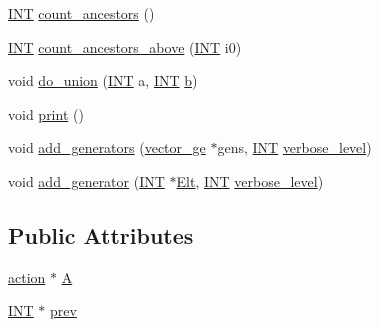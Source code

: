 \begin{DoxyCompactItemize}
\item 
\mbox{\hyperlink{galois_8h_a09fddde158a3a20bd2dcadb609de11dc}{I\+NT}} \mbox{\hyperlink{classunion__find_ad98f42a8846fb89237b9c27e594ec2ee}{count\+\_\+ancestors}} ()
\item 
\mbox{\hyperlink{galois_8h_a09fddde158a3a20bd2dcadb609de11dc}{I\+NT}} \mbox{\hyperlink{classunion__find_a5f30bf72e328168c13e4e68f7c2d4483}{count\+\_\+ancestors\+\_\+above}} (\mbox{\hyperlink{galois_8h_a09fddde158a3a20bd2dcadb609de11dc}{I\+NT}} i0)
\item 
void \mbox{\hyperlink{classunion__find_a7c57b5cf10387d978dc5c46c0e5f5f91}{do\+\_\+union}} (\mbox{\hyperlink{galois_8h_a09fddde158a3a20bd2dcadb609de11dc}{I\+NT}} a, \mbox{\hyperlink{galois_8h_a09fddde158a3a20bd2dcadb609de11dc}{I\+NT}} \mbox{\hyperlink{alphabet2_8_c_a148e3876077787926724625411d6e7a9}{b}})
\item 
void \mbox{\hyperlink{classunion__find_af6000e243b74029060540235bd2b89fe}{print}} ()
\item 
void \mbox{\hyperlink{classunion__find_af020c4dd8966a2917b6ae1f6c925c4dc}{add\+\_\+generators}} (\mbox{\hyperlink{classvector__ge}{vector\+\_\+ge}} $\ast$gens, \mbox{\hyperlink{galois_8h_a09fddde158a3a20bd2dcadb609de11dc}{I\+NT}} \mbox{\hyperlink{simeon_8_c_a818073fbcc2f439e7c56952f67386122}{verbose\+\_\+level}})
\item 
void \mbox{\hyperlink{classunion__find_a40d8a9f64ec55632cefd15df02bf7204}{add\+\_\+generator}} (\mbox{\hyperlink{galois_8h_a09fddde158a3a20bd2dcadb609de11dc}{I\+NT}} $\ast$\mbox{\hyperlink{simeon_8_c_aec1406935bdb1fee3561fcb840964100}{Elt}}, \mbox{\hyperlink{galois_8h_a09fddde158a3a20bd2dcadb609de11dc}{I\+NT}} \mbox{\hyperlink{simeon_8_c_a818073fbcc2f439e7c56952f67386122}{verbose\+\_\+level}})
\end{DoxyCompactItemize}
\subsection*{Public Attributes}
\begin{DoxyCompactItemize}
\item 
\mbox{\hyperlink{classaction}{action}} $\ast$ \mbox{\hyperlink{classunion__find_ae5239695ba43f51fd2984ed7cf4922cf}{A}}
\item 
\mbox{\hyperlink{galois_8h_a09fddde158a3a20bd2dcadb609de11dc}{I\+NT}} $\ast$ \mbox{\hyperlink{classunion__find_ac0a49d7e715e1627cc35f9eb6a62367f}{prev}}
\end{DoxyCompactItemize}
